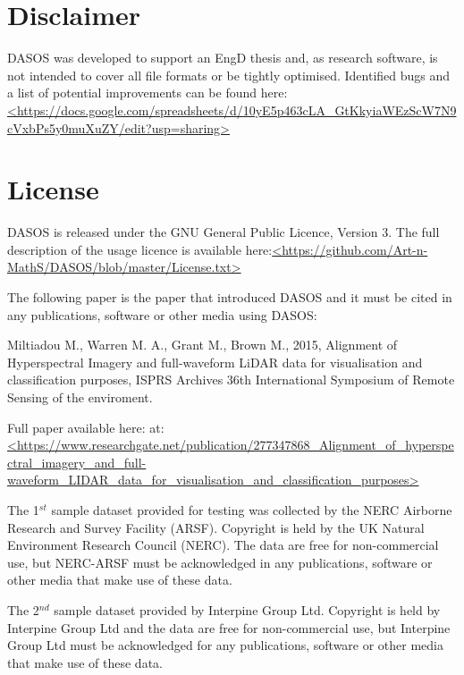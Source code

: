 \documentclass{article}
\begin{document}
	 \section{Disclaimer}
	\par DASOS was developed to support an EngD thesis and, as research software, is not intended to cover all file formats or be tightly optimised.
	\newline\newline
	Identified bugs and a list of potential improvements can be found here:
	\url{<https://docs.google.com/spreadsheets/d/10yE5p463cLA_GtKkyiaWEzScW7N9cVxbPs5y0muXuZY/edit?usp=sharing>}
	\setcounter{secnumdepth}{0}
	
		
		
		\section{License} \label{License}
		
		\par DASOS is released under the GNU General Public Licence, Version 3. The full description of the usage licence is available here:\url{<https://github.com/Art-n-MathS/DASOS/blob/master/License.txt>}
		
		\par The following paper is the paper that introduced DASOS and it must be cited in any publications, software or other media using DASOS:
		
		Miltiadou M., Warren M. A., Grant M., Brown M., 2015, Alignment of Hyperspectral Imagery and full-waveform LiDAR data for visualisation and classification purposes, ISPRS Archives 36th International Symposium of	Remote Sensing of the enviroment. \cite{Miltiadou2015}
		
		\par Full paper available here: at:\url{<https://www.researchgate.net/publication/277347868_Alignment_of_hyperspectral_imagery_and_full-waveform_LIDAR_data_for_visualisation_and_classification_purposes>}
		
		
		
		\par The 1$^{st}$ sample dataset provided for testing was collected by the NERC Airborne Research and Survey Facility (ARSF). Copyright is held by the UK Natural Environment Research Council (NERC). The data are free for non-commercial use, but NERC-ARSF must be acknowledged in any publications, software or other media that make use of these data.
		
		\par The 2$^{nd}$ sample dataset provided by Interpine Group Ltd. Copyright is held by Interpine Group Ltd and the data are free for non-commercial use, but Interpine Group Ltd must be acknowledged for any publications, software or other media that make use of these data. 
\end{document}
